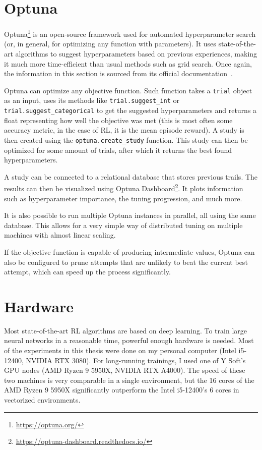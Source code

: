 \documentclass[
  digital,     %
  oneside,     %
  nosansbold,  %
  nocolorbold, %
  lof,         %
  lot,         %
]{fithesis4}
\begin{document}
\section{Optuna}
\label{sec:optuna}

Optuna\footnote{\url{https://optuna.org/}} is an open-source framework used for automated hyperparameter search (or, in general, for optimizing any function with parameters). It uses state-of-the-art algorithms to suggest hyperparameters based on previous experiences, making it much more time-efficient than usual methods such as grid search. Once again, the information in this section is sourced from its official documentation~\cite{optuna-docs}.

Optuna can optimize any objective function. Such function takes a \texttt{trial} object as an input, uses its methods like \texttt{trial.suggest\_int} or \texttt{trial.suggest\_categorical} to get the suggested hyperparameters and returns a float representing how well the objective was met (this is most often some accuracy metric, in the case of RL, it is the mean episode reward). A study is then created using the \texttt{optuna.create\_study} function. This study can then be optimized for some amount of trials, after which it returns the best found hyperparameters.

A study can be connected to a relational database that stores previous trails. The results can then be visualized using Optuna Dashboard\footnote{\url{https://optuna-dashboard.readthedocs.io/}}. It plots information such as hyperparameter importance, the tuning progression, and much more.

It is also possible to run multiple Optuna instances in parallel, all using the same database. This allows for a very simple way of distributed tuning on multiple machines with almost linear scaling.

If the objective function is capable of producing intermediate values, Optuna can also be configured to prune attempts that are unlikely to beat the current best attempt, which can speed up the process significantly.

\section{Hardware}

Most state-of-the-art RL algorithms are based on deep learning. To train large neural networks in a reasonable time, powerful enough hardware is needed. Most of the experiments in this thesis were done on my personal computer (Intel i5-12400, NVIDIA RTX 3080). For long-running trainings, I used one of Y Soft's GPU nodes (AMD Ryzen 9 5950X, NVIDIA RTX A4000). The speed of these two machines is very comparable in a single environment, but the 16 cores of the AMD Ryzen 9 5950X significantly outperform the Intel i5-12400's 6 cores in vectorized environments.
\end{document}
